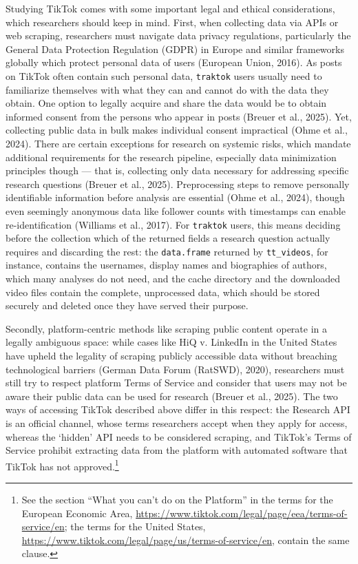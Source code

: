 \documentclass[
  nobib]{ccr}
\begin{document}
Studying TikTok comes with some important legal and ethical
considerations, which researchers should keep in mind. First, when
collecting data via APIs or web scraping, researchers must navigate data
privacy regulations, particularly the General Data Protection Regulation
(GDPR) in Europe and similar frameworks globally which protect personal
data of users (European Union, 2016). As posts on TikTok often contain
such personal data, \texttt{traktok} users usually need to familiarize
themselves with what they can and cannot do with the data they obtain.
One option to legally acquire and share the data would be to obtain
informed consent from the persons who appear in posts (Breuer et al.,
2025). Yet, collecting public data in bulk makes individual consent
impractical (Ohme et al., 2024). There are certain exceptions for
research on systemic risks, which mandate additional requirements for
the research pipeline, especially data minimization principles though
--- that is, collecting only data necessary for addressing specific
research questions (Breuer et al., 2025). Preprocessing steps to remove
personally identifiable information before analysis are essential (Ohme
et al., 2024), though even seemingly anonymous data like follower counts
with timestamps can enable re-identification (Williams et al., 2017).
For \texttt{traktok} users, this means deciding before the collection
which of the returned fields a research question actually requires and
discarding the rest: the \texttt{data.frame} returned by
\texttt{tt\_videos}, for instance, contains the usernames, display names
and biographies of authors, which many analyses do not need, and the
cache directory and the downloaded video files contain the complete,
unprocessed data, which should be stored securely and deleted once they
have served their purpose.

Secondly, platform-centric methods like scraping public content operate
in a legally ambiguous space: while cases like HiQ v. LinkedIn in the
United States have upheld the legality of scraping publicly accessible
data without breaching technological barriers (German Data Forum
(RatSWD), 2020), researchers must still try to respect platform Terms of
Service and consider that users may not be aware their public data can
be used for research (Breuer et al., 2025). The two ways of accessing
TikTok described above differ in this respect: the Research API is an
official channel, whose terms researchers accept when they apply for
access, whereas the `hidden' API needs to be considered scraping, and
TikTok's Terms of Service prohibit extracting data from the platform
with automated software that TikTok has not approved.\footnote{See the
  section ``What you can't do on the Platform'' in the terms for the
  European Economic Area,
  \url{https://www.tiktok.com/legal/page/eea/terms-of-service/en}; the
  terms for the United States,
  \url{https://www.tiktok.com/legal/page/us/terms-of-service/en},
  contain the same clause.}
\end{document}
